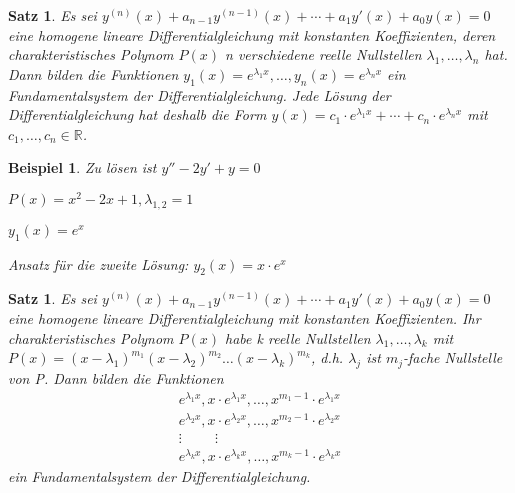 \documentclass[fontset=ubuntu,12pt,a4paper]{scrreprt}
\newtheorem{beispiel}[defi]{Beispiel}
\newtheorem{satz}[defi]{Satz}
\begin{document}
    \begin{satz}
        Es sei \(y^{(n)}(x) + a_{n-1} y^{(n-1)}(x) + \cdots + a_1 y'(x) + a_0 y(x) = 0\) eine homogene lineare Differentialgleichung mit konstanten Koeffizienten, deren charakteristisches Polynom \(P(x)\) n verschiedene reelle Nullstellen \(\lambda_1,\dots,\lambda_n\) hat. Dann bilden die Funktionen \(y_1(x)=e^{\lambda_1 x},\dots,y_n(x)=e^{\lambda_n x}\) ein Fundamentalsystem der Differentialgleichung. Jede Lösung der Differentialgleichung hat deshalb die Form \(y(x)=c_1 \cdot e^{\lambda_1 x} + \cdots + c_n \cdot e^{\lambda_n x}\) mit \(c_1,\dots,c_n \in \mathbb{R}\).
    \end{satz}

    \begin{beispiel}
        Zu lösen ist \(y''-2y'+y=0\)

        \(P(x)=x^2-2x+1,\lambda_{1,2}=1\)

        \(y_1(x)=e^x\)

        Ansatz für die zweite Lösung: \(y_2(x)=x \cdot e^x\)
    \end{beispiel}

    \begin{satz}
        Es sei \(y^{(n)}(x) + a_{n-1} y^{(n-1)}(x) + \cdots + a_1 y'(x) + a_0 y(x) = 0\) eine homogene lineare Differentialgleichung mit konstanten Koeffizienten. Ihr charakteristisches Polynom \(P(x)\) habe k reelle Nullstellen \(\lambda_1,\dots,\lambda_k\) mit \(P(x)={(x-\lambda_1)}^{m_1}{(x-\lambda_2)}^{m_2} \dots {(x-\lambda_k)}^{m_k}\), d.h. \(\lambda_j\) ist \(m_j\)-fache Nullstelle von P. Dann bilden die Funktionen
        \begin{align*}
            e^{\lambda_1 x},x \cdot e^{\lambda_1 x},\dots,x^{m_1-1} \cdot e^{\lambda_1 x} \\
            e^{\lambda_2 x},x \cdot e^{\lambda_2 x},\dots,x^{m_2-1} \cdot e^{\lambda_2 x} \\
            \vdots \hspace{1cm} \vdots \hspace{1cm} \\
            e^{\lambda_k x},x \cdot e^{\lambda_k x},\dots,x^{m_k-1} \cdot e^{\lambda_k x}
        \end{align*}
        ein Fundamentalsystem der Differentialgleichung.
    \end{satz}
\end{document}
